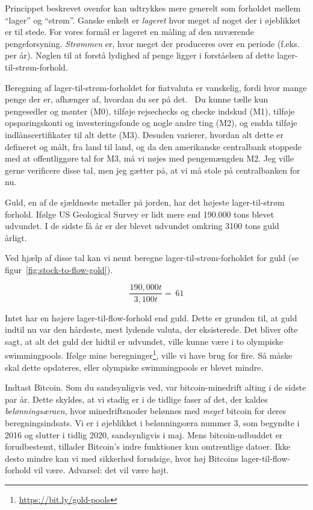Princippet beskrevet ovenfor kan udtrykkes mere generelt som
forholdet mellem \enquote{lager} og \enquote{strøm}. Ganske enkelt er \textit{lageret} hvor meget af
noget der i øjeblikket er til stede. For vores formål er lageret en måling
af den nuværende pengeforsyning. \textit{Strømmen} er, hvor meget der produceres
over en periode (f.eks. per år). Nøglen til at forstå lydighed
af penge ligger i forståelsen af dette lager-til-strøm-forhold.

Beregning af lager-til-strøm-forholdet for fiatvaluta er vanskelig, fordi hvor
mange penge der er, afhænger af, hvordan du ser på det.~\cite{wiki:money-supply} Du
kunne tælle kun pengesedler og mønter (M0), tilføje rejsechecks og checke
indskud (M1), tilføje opsparingskonti og investeringsfonde og nogle andre ting (M2),
og endda tilføje indlånscertifikater til alt dette (M3). Desuden varierer, hvordan alt
dette er defineret og målt, fra land til land, og da den amerikanske
centralbank stoppede med at offentliggøre \cite{web:fed-m3} tal for M3, må vi
nøjes med pengemængden M2. Jeg ville gerne verificere disse
tal, men jeg gætter på, at vi må stole på centralbanken for nu.

Guld, en af de sjældneste metaller på jorden, har det højeste lager-til-strøm
forhold. Ifølge US Geological Survey er lidt mere end 190.000 tons blevet udvundet.
I de sidste få år er der blevet udvundet omkring 3100 tons guld
årligt.~\cite{mineral-commodity-summaries}

Ved hjælp af disse tal kan vi nemt beregne lager-til-strøm-forholdet for
guld (se figur~\ref{fig:stock-to-flow-gold}).

\begin{center}
  \centering
  \begin{equation}
  \frac{190,000 t}{3,100 t} = ~ 61
  \end{equation}
  \label{fig:stock-to-flow-gold}
\end{center}

Intet har en højere lager-til-flow-forhold end guld. Dette er grunden til, at guld indtil nu
var den hårdeste, mest lydende valuta, der eksisterede. Det bliver ofte sagt, at alt det guld
der hidtil er udvundet, ville kunne være i to olympiske swimmingpools. Ifølge mine
beregninger\footnote{\url{https://bit.ly/gold-pools}}, ville vi have brug for fire. Så
måske skal dette opdateres, eller olympiske swimmingpools er blevet mindre.

Indtast Bitcoin. Som du sandsynligvis ved, var bitcoin-minedrift alting i
de sidste par år. Dette skyldes, at vi stadig er i de tidlige
faser af det, der kaldes \textit{belønningsæraen}, hvor minedriftsnoder
belønnes med \textit{meget} bitcoin for deres beregningsindsats. Vi er
i øjeblikket i belønningsæra nummer 3, som begyndte i 2016 og slutter i
tidlig 2020, sandsynligvis i maj. Mens bitcoin-udbuddet er forudbestemt,
tillader Bitcoin's indre funktioner kun omtrentlige datoer.
Ikke desto mindre kan vi med sikkerhed forudsige, hvor høj Bitcoins
lager-til-flow-forhold vil være. Advarsel: det vil være højt.

